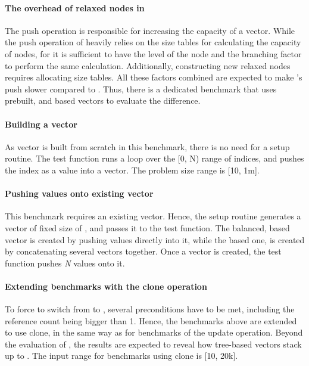 \paragraph*{The overhead of relaxed nodes in \rrbtree{}}
The push operation is responsible for increasing the capacity of a vector. While the push operation of \rrbtree{} heavily relies on the size tables for calculating the capacity of nodes, for \rbtree{} it is sufficient to have the level of the node and the branching factor to perform the same calculation. Additionally, constructing new relaxed nodes requires allocating size tables. All these factors combined are expected to make \rrbtree{}'s push slower compared to \rbtree{}. Thus, there is a dedicated benchmark that uses prebuilt, \rrbtree{} and \rbtree{} based vectors to evaluate the difference.  

\paragraph*{Building a vector}
As vector is built from scratch in this benchmark, there is no need for a setup routine. The test function runs a loop over the [0, N) range of indices, and pushes the index as a value into a vector. The problem size range is [10, 1m]. 

\paragraph*{Pushing values onto existing vector}
This benchmark requires an existing vector. Hence, the setup routine generates a vector of fixed size of , and passes it to the test function. The balanced, \rbtree{} based vector is created by pushing values directly into it, while the \rrbtree{} based one, is created by concatenating several vectors together. Once a vector is created, the test function pushes \emph{N} values onto it. 

\paragraph*{Extending benchmarks with the clone operation}
To force \pvec{} to switch from \stdvec{} to \rrbvec{}, several preconditions have to be met, including the reference count being bigger than 1. Hence, the benchmarks above are extended to use clone, in the same way as for benchmarks of the update operation. Beyond the evaluation of \pvec{}, the results are expected to reveal how tree-based vectors stack up to \stdvec{}. The input range for benchmarks using clone is [10, 20k]. 

